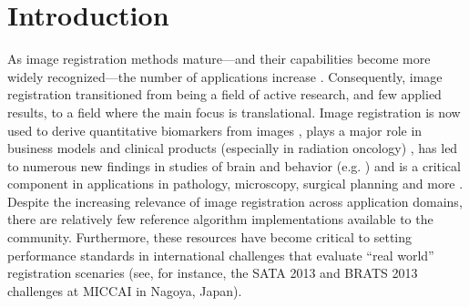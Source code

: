 \documentclass{frontiersSCNS}
\begin{document}
\section{Introduction}
As image registration methods mature---and their capabilities become
more widely recognized---the number of applications increase
\cite{Rueckert1999,2004,Shelton2005,Miller2005,Chen2008,Cheung2009,Baloch2009,Peyrat2010,Metz2011,Kikinis2011,Fedorov2011,Murphy2011}.
Consequently, image registration transitioned from being a field of active research, and few applied results, to a
field where the main focus is translational.  Image registration is
now used to derive quantitative biomarkers from images
\cite{Jack2010a}, plays a major role in business models and clinical
products (especially in radiation oncology) \cite{Cheung2009}, has led
to numerous new findings in studies of brain and behavior (e.g. \cite{Bearden2007}) and is a critical component in applications in
pathology, microscopy, surgical planning and more
\cite{Shelton2005,Miller2005,Floca2007,Chen2008,Cheung2009,Peyrat2010,Kikinis2011,Murphy2011}.
Despite the increasing relevance of image registration across
application domains, there are relatively few reference algorithm
implementations available to the community.  Furthermore, these
resources have become critical to setting performance standards in
international challenges that evaluate ``real world'' registration
scenaries (see, for instance, the SATA 2013 and BRATS 2013 challenges
at MICCAI in Nagoya, Japan). 





\end{document}
